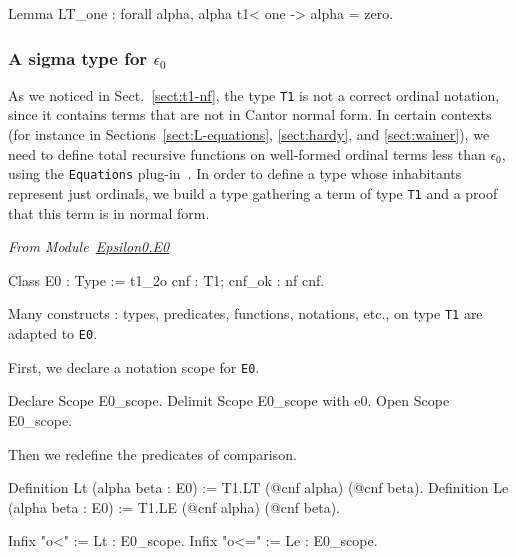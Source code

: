 \documentclass[a4paper]{book}
\begin{document}
\begin{Coqsrc}
Lemma LT_one : forall alpha, alpha t1< one -> alpha = zero.
\end{Coqsrc}

  
\subsubsection{A sigma type for \texorpdfstring{$\epsilon_0$}{epsilon0}}

As we noticed in Sect.~\ref{sect:t1-nf}, the type \texttt{T1} is not a correct ordinal notation, since it contains terms that are not in Cantor normal form. In certain contexts (for instance in Sections~\ref{sect:L-equations}, \ref{sect:hardy},
and \ref{sect:wainer}),  we need to define total recursive functions on well-formed ordinal terms less  than $\epsilon_0$, using the \texttt{Equations} plug-in~\cite{sozeau:hal-01671777}.
 In order to define a type whose inhabitants represent just ordinals, we build a type gathering a term of type \texttt{T1} and a proof that this term is in normal form.
 

\label{sect:E0-def}
\label{types:E0}

\emph{From Module~\href{../src/html/hydras.Epsilon0.E0.html}{Epsilon0.E0}}


\begin{Coqsrc}
Class E0 : Type := t1_2o {cnf : T1; cnf_ok : nf cnf}.
\end{Coqsrc}

Many constructs : types, predicates, functions, notations, etc., on type \texttt{T1} are adapted to \texttt{E0}.

First, we declare a notation scope for \texttt{E0}.

\begin{Coqsrc}
Declare Scope E0_scope.
Delimit Scope E0_scope with e0.
Open Scope E0_scope.
\end{Coqsrc}

Then we redefine the predicates of comparison.

\label{Predicates:Lt-E0}

\begin{Coqsrc}
Definition Lt (alpha beta : E0) := T1.LT (@cnf alpha) (@cnf beta).
Definition Le (alpha beta : E0) := T1.LE (@cnf alpha) (@cnf beta).

Infix "o<" := Lt : E0_scope.
Infix "o<=" := Le : E0_scope.
\end{Coqsrc}
  
\end{document}

